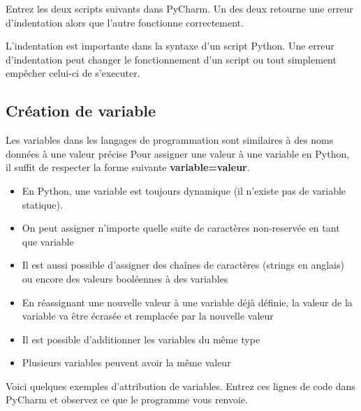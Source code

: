 \begin{conseil}
Entrez les deux scripts suivants dans PyCharm. Un des deux retourne une erreur d'indentation alors que l'autre fonctionne correctement.
\end{conseil}

\begin{solution}

\end{solution}

\begin{solution}

\end{solution}

L'indentation est importante dans la syntaxe d'un script Python. Une erreur d'indentation peut changer le fonctionnement d'un script ou tout simplement empêcher celui-ci de s'executer.

\subsection{Création de variable}
Les variables dans les langages de programmation sont similaires à des noms données à une valeur précise
Pour assigner une valeur à une variable en Python, il suffit de respecter la forme suivante \textbf{variable=valeur}.

\begin{conseil}
\begin{itemize}
	\item En Python, une variable est  toujours dynamique (il n'existe pas de variable statique).
	\item On peut assigner n'importe quelle suite de caractères non-reservée en tant que variable
	\item Il est aussi possible d'assigner des chaînes de caractères (strings en anglais) ou encore des valeurs booléennes à des variables
	\item En réassignant une nouvelle valeur à une variable déjà définie, la valeur de la variable va être écrasée et remplacée par la nouvelle valeur
	\item Il est possible d'additionner les variables du même type
	\item Plusieurs variables peuvent avoir la même valeur
\end{itemize}
\end{conseil}

Voici quelques exemples d'attribution de variables. Entrez ces lignes de code dans PyCharm et observez ce que le programme vous renvoie.

\begin{solution}
    
    
\end{solution}



